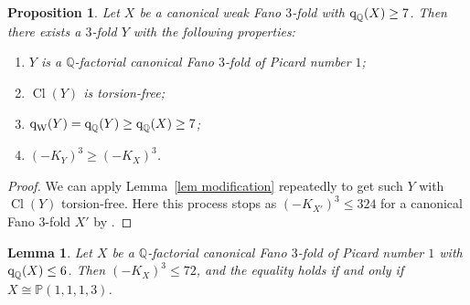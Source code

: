 \documentclass[12pt,twoside]{amsart}
\DeclareMathOperator{\Cl}{Cl}
\newcommand{\qW}{\text{\rm q}_{\text{\rm W}}}
\newcommand{\qQ}{\text{\rm q}_{\mathbb{Q}}}
\newtheorem{lem}[thm]{Lemma}
\newtheorem{prop}[thm]{Proposition}
\theoremstyle{definition}
\begin{document}
\begin{prop}\label{prop modification}
 Let $X$ be a canonical weak Fano $3$-fold with $\qQ(X)\geq 7$.
 Then there exists a $3$-fold $Y$ with the following properties:
 \begin{enumerate}
 \item $Y$ is a $\mathbb Q$-factorial canonical Fano $3$-fold of Picard number $1$;

 \item $\Cl (Y)$ is torsion-free;
 
 \item $\qW(Y)=\qQ(Y)\geq \qQ(X)\geq 7$;

 \item $(-K_Y)^3\geq (-K_X)^3$. 
 \end{enumerate}
\end{prop}

\begin{proof}
We can apply Lemma~\ref{lem modification} repeatedly to get such $Y$ with $\Cl (Y)$ torsion-free. Here this process stops as $(-K_{X'})^3\leq 324$ for a canonical Fano $3$-fold $X'$ by \cite[{Theorem~1.1}]{JiangZou2023}.
\end{proof}

 


\begin{lem}\label{lem.upbisoforq<=6}
 Let $X$ be a $\mathbb Q$-factorial canonical Fano $3$-fold of Picard number $1$ with $\qQ(X)\leq 6$. Then $(-K_X)^3\leq 72$, and the equality holds if and only if $X\cong \mathbb P(1,1,1,3)$. 
\end{lem}
\end{document}
